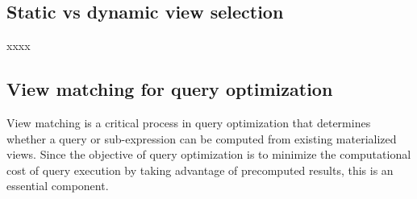 \subsection{ Static vs dynamic view selection } xxxx

\subsection{View matching for query optimization }

View matching is a critical process in query optimization that determines whether a query or sub-expression can be computed from existing materialized views. Since the objective of query optimization is to minimize the computational cost of query execution by taking advantage of precomputed results, this is an essential component.\\

